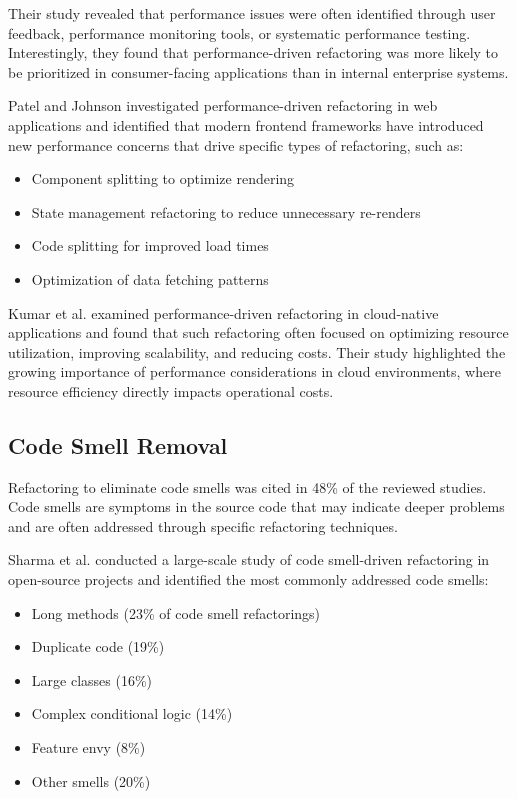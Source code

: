 \documentclass[journal,onecolumn]{IEEEtran}
\begin{document}
Their study revealed that performance issues were often identified through user feedback, performance monitoring tools, or systematic performance testing. Interestingly, they found that performance-driven refactoring was more likely to be prioritized in consumer-facing applications than in internal enterprise systems.

Patel and Johnson \cite{patel2024} investigated performance-driven refactoring in web applications and identified that modern frontend frameworks have introduced new performance concerns that drive specific types of refactoring, such as:
\begin{itemize}
    \item Component splitting to optimize rendering
    \item State management refactoring to reduce unnecessary re-renders
    \item Code splitting for improved load times
    \item Optimization of data fetching patterns
\end{itemize}

Kumar et al. \cite{kumar2022} examined performance-driven refactoring in cloud-native applications and found that such refactoring often focused on optimizing resource utilization, improving scalability, and reducing costs. Their study highlighted the growing importance of performance considerations in cloud environments, where resource efficiency directly impacts operational costs.

\subsection{Code Smell Removal}
Refactoring to eliminate code smells was cited in 48\% of the reviewed studies. Code smells are symptoms in the source code that may indicate deeper problems and are often addressed through specific refactoring techniques.

Sharma et al. \cite{sharma2023} conducted a large-scale study of code smell-driven refactoring in open-source projects and identified the most commonly addressed code smells:
\begin{itemize}
    \item Long methods (23\% of code smell refactorings)
    \item Duplicate code (19\%)
    \item Large classes (16\%)
    \item Complex conditional logic (14\%)
    \item Feature envy (8\%)
    \item Other smells (20\%)
\end{itemize}
\end{document}
